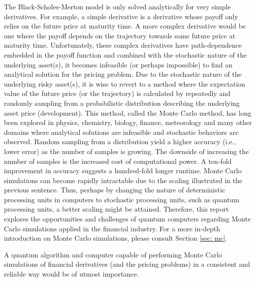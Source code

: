 \documentclass[../main.tex]{subfiles}
\begin{document}
The Black-Scholes-Merton model is only solved analytically for very simple derivatives. For example, a simple derivative is a derivative whose payoff only relies on the future price at maturity time. A more complex derivative would be one where the payoff depends on the trajectory towards some future price at maturity time. Unfortunately, these complex derivatives have path-dependence embedded in the payoff function and combined with the stochastic nature of the underlying asset(s), it becomes infeasible (or perhaps impossible) to find an analytical solution for the pricing problem. Due to the stochastic nature of the underlying risky asset(s), it is wise to revert to a method where the expectation value of the future price (or the trajectory) is calculated by repeatedly and randomly sampling from a probabilistic distribution describing the underlying asset price (development). This method, called the Monte Carlo method, has long been explored in physics, chemistry, biology, finance, meteorology and many other domains where analytical solutions are infeasible and stochastic behaviors are observed. Random sampling from a distribution yield a higher accuracy (i.e., lower error) as the number of samples is growing. The downside of increasing the number of samples is the increased cost of computational power. A ten-fold improvement in accuracy suggests a hundred-fold longer runtime. Monte Carlo simulations can become rapidly intractable due to the scaling illustrated in the previous sentence. Thus, perhaps by changing the nature of deterministic processing units in computers to stochastic processing units, such as quantum processing units, a better scaling might be attained. Therefore, this report explores the opportunities and challenges of quantum computers regarding Monte Carlo simulations applied in the financial industry. For a more in-depth introduction on Monte Carlo simulations, please consult Section \ref{sec: mc}.

A quantum algorithm and computer capable of performing Monte Carlo simulations of financial derivatives (and the pricing problems) in a consistent and reliable way would be of utmost importance. 
\biblio
\end{document}
